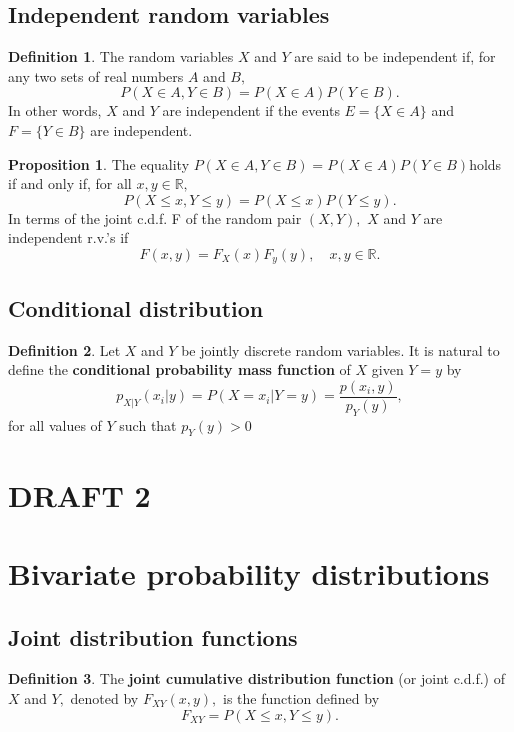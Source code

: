\documentclass[12pt, a4paper]{article}
\newcommand{\bb}[1]{\mathbb{#1}}
\theoremstyle{definition}
\newtheorem{definition}{Definition}[section]
\newtheorem{proposition}{Proposition}
\theoremstyle{plain}
\begin{document}
\subsection{Independent random variables}

\begin{definition}
The random variables $X$ and $Y$ are said to be independent if, for any two sets of real numbers $A$ and $B,$ $$P(X\in A, Y\in B)=P(X\in A)P(Y\in B).$$ In other words, $X$ and $Y$ are independent if the events $E = \{X \in A\}$ and $F = \{Y \in B\}$ are independent.
\end{definition}

\begin{proposition}
The equality $P(X\in A, Y\in B)=P(X\in A)P(Y\in B) $holds if and only if, for all $x,y \in \bb{R},$ $$P(X\leq x , Y\leq y)=P(X\leq x)P(Y\leq y).$$ In terms of the joint c.d.f. F of the random pair $(X,Y),$ $X$ and $Y$ are independent r.v.’s if $$F(x,y)=F_X(x)F_y(y), \quad x,y\in \bb{R}.$$

\end{proposition}

\subsection{Conditional distribution}

\begin{definition}
Let $X$ and $Y$ be jointly discrete random variables. It is natural to define the \textbf{conditional probability mass function} of $X$ given $Y = y$ by $$p_{X|Y}(x_i|y)=P(X=x_i|Y=y)=\frac{p(x_i,y)}{p_Y(y)},$$ for all values of $Y$ such that $p_Y (y) > 0$
\end{definition}

\pagebreak 

\section{DRAFT 2}

\section{Bivariate probability distributions}

\subsection{Joint distribution functions}

\begin{definition}
The \textbf{joint cumulative distribution function} (or joint c.d.f.) of $X$ and $Y,$ denoted by $F_{XY}(x,y),$ is the function defined by $$F_{XY}=P(X\leq x, Y \leq y).$$
\end{definition}
\end{document}
